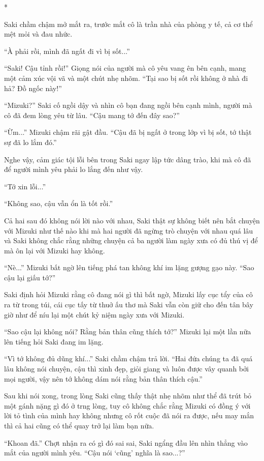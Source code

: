 {*

Saki chầm chậm mở mắt ra, trước mắt cô là trần nhà của phòng y tế, cả cơ
thể mệt mỏi và đau nhức.

``À phải rồi, mình đã ngất đi vì bị sốt...''

``Saki! Cậu tỉnh rồi!'' Giọng nói của người mà cô yêu vang ên bên cạnh,
mang một cảm xúc vội vã và một chút nhẹ nhõm. ``Tại sao bị sốt rồi không
ở nhà đi hả? Đồ ngốc này!''

``Mizuki?'' Saki cố ngồi dậy và nhìn cô bạn đang ngồi bên cạnh mình,
người mà cô đã đem lòng yêu từ lâu. ``Cậu mang tớ đến đây sao?''

``Ừm...'' Mizuki chậm rãi gật đầu. ``Cậu đã bị ngất ở trong lớp vì bị
sốt, tớ thật sự đã lo lắm đó.''

Nghe vậy, cảm giác tội lỗi bên trong Saki ngay lập tức dâng trào, khi mà
cô đã để người mình yêu phải lo lắng đến như vậy.

``Tớ xin lỗi...''

``Không sao, cậu vẫn ổn là tốt rồi.''

Cả hai sau đó không nói lời nào với nhau, Saki thật sự không biết nên
bắt chuyện với Mizuki như thế nào khi mà hai người đã ngừng trò chuyện
với nhau quá lâu và Saki không chắc rằng những chuyện cả ba người làm
ngày xưa có đủ thú vị để mà ôn lại với Mizuki hay không.

``Nè...'' Mizuki bất ngờ lên tiếng phá tan không khí im lặng gượng gạo
này. ``Sao cậu lại giấu tớ?''

Saki định hỏi Mizuki rằng cô đang nói gì thì bất ngờ, Mizuki lấy cục tẩy
của cô ra từ trong túi, cái cục tấy từ thuở ấu thơ mà Saki vẫn còn giữ
cho đến tân bây giờ như để níu lại một chút kỷ niệm ngày xưa với Mizuki.

``Sao cậu lại không nói? Rằng bản thân cũng thích tớ?'' Mizuki lại một
lần nữa lên tiếng hỏi Saki đang im lặng.

``Vì tớ không đủ dũng khí...'' Saki chầm chậm trả lời. ``Hai đứa chúng
ta đã quá lâu không nói chuyện, cậu thì xinh đẹp, giỏi giang và luôn
được vây quanh bởi mọi người, vậy nên tớ không dám nói rằng bản thân
thích cậu.''

Sau khi nói xong, trong lòng Saki cũng thấy thật nhẹ nhõm như thể đã
trút bỏ một gánh nặng gì đó ở trng lòng, tuy cô không chắc rằng Mizuki
có đồng ý với lời tỏ tình của mình hay không nhưng cô rốt cuộc đã nói ra
được, nếu may mắn thì cả hai cũng có thể quay trở lại làm bạn nữa.

``Khoan đã.'' Chợt nhận ra có gì đó sai sai, Saki ngẩng đầu lên nhìn
thẳng vào mắt của người mình yêu. ``Cậu nói `cũng' nghĩa là sao...?''

}
